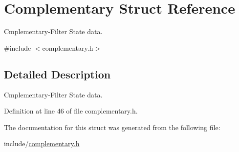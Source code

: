 \hypertarget{struct_complementary}{\section{Complementary Struct Reference}
\label{struct_complementary}
}


Cmplementary-\/\-Filter State data.  




{\ttfamily \#include $<$complementary.\-h$>$}



\subsection{Detailed Description}
Cmplementary-\/\-Filter State data. 

Definition at line 46 of file complementary.\-h.



The documentation for this struct was generated from the following file\-:\begin{DoxyCompactItemize}
\item 
include/\hyperlink{complementary_8h}{complementary.\-h}\end{DoxyCompactItemize}
